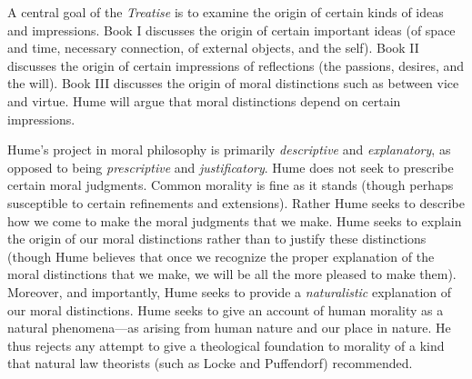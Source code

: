 A central goal of the \emph{Treatise} is to examine the origin of certain kinds of ideas and impressions. Book I discusses the origin of certain important ideas (of space and time, necessary connection, of external objects, and the self). Book II discusses the origin of certain impressions of reflections (the passions, desires, and the will). Book III discusses the origin of moral distinctions such as between vice and virtue. Hume will argue that moral distinctions depend on certain impressions.

Hume’s project in moral philosophy is primarily \emph{descriptive} and \emph{explanatory}, as opposed to being \emph{prescriptive} and \emph{justificatory}. Hume does not seek to prescribe certain moral judgments. Common morality is fine as it stands (though perhaps susceptible to certain refinements and extensions). Rather Hume seeks to describe how we come to make the moral judgments that we make. Hume seeks to explain the origin of our moral distinctions rather than to justify these distinctions (though Hume believes that once we recognize the proper explanation of the moral distinctions that we make, we will be all the more pleased to make them). Moreover, and importantly, Hume seeks to provide a \emph{naturalistic} explanation of our moral distinctions. Hume seeks to give an account of human morality as a natural phenomena---as arising from human nature and our place in nature. He thus rejects any attempt to give a theological foundation to morality of a kind that natural law theorists (such as Locke and Puffendorf) recommended.

